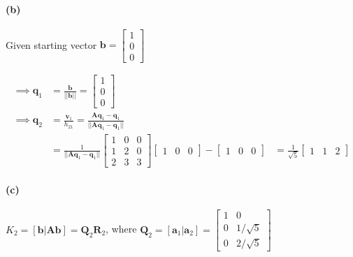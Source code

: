 \documentclass[12pt, letterpaper]{article}
\begin{document}
\paragraph{(b)} Given starting vector $\mathbf{b} =
\begin{bmatrix}1 \\ 0 \\ 0 \end{bmatrix}$

\begin{align*}
  \implies \mathbf{q}_1 &= \frac{\mathbf{b}}{||\mathbf{b}||} = 
  \begin{bmatrix}1 \\ 0 \\ 0 \end{bmatrix} \\
  \implies \mathbf{q}_2 &= \frac{\mathbf{v}_1}{h_{21}}
                         = \frac{\mathbf{A}\mathbf{q}_1 - \mathbf{q}_1}{||\mathbf{A}\mathbf{q}_1 - \mathbf{q}_1||} \\
&= \frac{1}{||\mathbf{A}\mathbf{q}_1 - \mathbf{q}_1||}
\begin{bmatrix} 1 & 0 & 0 \\ 1 & 2 & 0 \\ 2 & 3 & 3 \end{bmatrix}
\begin{bmatrix} 1 & 0 & 0 \end{bmatrix}
 - \begin{bmatrix} 1 & 0 & 0 \end{bmatrix}
  &= \frac{1}{\sqrt{5}}\begin{bmatrix} 1 & 1 & 2 \end{bmatrix}
\end{align*}

\paragraph{(c)} $K_2 = [\mathbf{b}|\mathbf{A}\mathbf{b}] = \mathbf{Q}_2\mathbf{R}_2$,
where $\mathbf{Q}_2 = [\mathbf{a}_1 | \mathbf{a}_2]
= \begin{bmatrix} 1 & 0 \\ 0 & 1/\sqrt{5} \\ 0 & 2/\sqrt{5} \end{bmatrix}$
\end{document}
